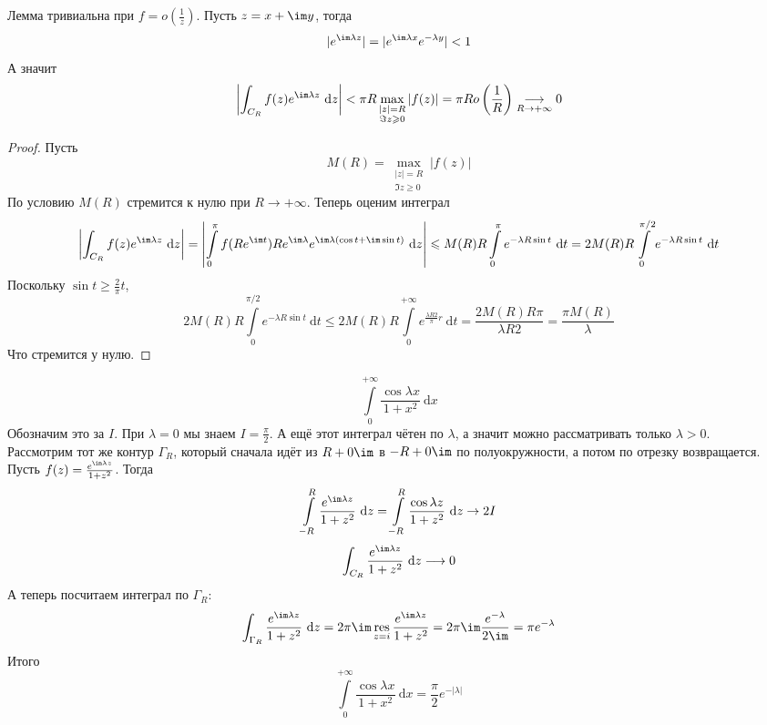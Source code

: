 \documentclass{article}
\begin{document}
    \begin{remark}
        Лемма тривиальна при $f=o\left(\frac1z\right)$. Пусть $z=x+\im y$, тогда
        $$
        |e^{\im\lambda z}|=|e^{\im\lambda x}e^{-\lambda y}|<1
        $$
        А значит
        $$
        \left|\int_{C_R}f(z)e^{\im\lambda z}~\mathrm dz\right|<\pi R\max\limits_{\substack{|z|=R\\\Im z\geqslant 0}}|f(z)|=\pi Ro\left(\frac1R\right)\underset{R\to+\infty}\longrightarrow0
        $$
    \end{remark}
    \begin{proof}
        Пусть
        $$M(R)=\max\limits_{\substack{|z|=R\\\Im z\geqslant 0}}|f(z)|$$
        По условию $M(R)$ стремится к нулю при $R\to+\infty$. Теперь оценим интеграл
        $$
        \left|\int_{C_R}f(z)e^{\im\lambda z}~\mathrm dz\right|=\left|\int\limits_0^\pi f(Re^{\im t})Re^{\im\lambda}e^{\im\lambda(\cos t+\im\sin t)}~\mathrm dz\right|\leqslant M(R)R\int\limits_0^\pi e^{-\lambda R\sin t}~\mathrm dt=2M(R)R\int\limits_0^{\pi/2}e^{-\lambda R\sin t}~\mathrm dt
        $$
        Поскольку $\sin t\geqslant\frac2\pi t$,
        $$
        2M(R)R\int\limits_0^{\pi/2}e^{-\lambda R\sin t}~\mathrm dt\leqslant 2M(R)R\int\limits_0^{+\infty}e^{\frac{\lambda R2}\pi r}~\mathrm dt=\frac{2M(R)R\pi}{\lambda R2}=\frac{\pi M(R)}\lambda
        $$
        Что стремится у нулю.
    \end{proof}
    \begin{example}
        $$
        \int\limits_0^{+\infty}\frac{\cos\lambda x}{1+x^2}~\mathrm dx
        $$
        Обозначим это за $I$. При $\lambda=0$ мы знаем $I=\frac\pi2$. А ещё этот интеграл чётен по $\lambda$, а значит можно рассматривать только $\lambda>0$.\\
        Рассмотрим тот же контур $\Gamma_R$, который сначала идёт из $R+0\im$ в $-R+0\im$ по полуокружности, а потом по отрезку возвращается.\\
        Пусть $f(z)=\frac{e^{\im\lambda z}}{1+z^2}$. Тогда
        $$
        \int\limits_{-R}^R\frac{e^{\im\lambda z}}{1+z^2}~\mathrm dz=\int\limits_{-R}^R\frac{\cos\lambda z}{1+z^2}~\mathrm dz\rightarrow2I
        $$
        $$
        \int_{C_R}\frac{e^{\im\lambda z}}{1+z^2}~\mathrm dz\longrightarrow0
        $$
        А теперь посчитаем интеграл по $\Gamma_R$:
        $$
        \int_{\Gamma_R}\frac{e^{\im\lambda z}}{1+z^2}~\mathrm dz=2\pi\im\operatorname*{res}_{z=i}\frac{e^{\im\lambda z}}{1+z^2}=2\pi\im\frac{e^{-\lambda}}{2\im}=\pi e^{-\lambda}
        $$
        Итого
        $$
        \int\limits_0^{+\infty}\frac{\cos\lambda x}{1+x^2}~\mathrm dx=\frac\pi2 e^{-|\lambda|}
        $$
    \end{example}
\end{document}
